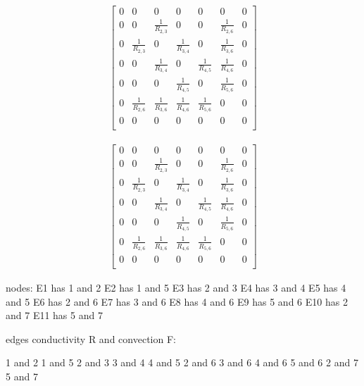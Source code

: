 \begin{equation}
	\begin{aligned}
		\begin{bmatrix}
			0 & 0 & 0 & 0 & 0 & 0 & 0\\
            0 & 0 & \frac{1}{R_{2,3}} & 0 & 0 & \frac{1}{R_{2,6}} & 0 \\
            0 & \frac{1}{R_{2,3}} & 0 & \frac{1}{R_{3,4}} & 0 & \frac{1}{R_{3,6}} & 0\\
            0 & 0 & \frac{1}{R_{3,4}} & 0 & \frac{1}{R_{4,5}} & \frac{1}{R_{4,6}} & 0\\
            0 & 0 & 0 & \frac{1}{R_{4,5}} & 0 & \frac{1}{R_{5,6}} & 0 \\
            0 & \frac{1}{R_{2,6}} & \frac{1}{R_{3,6}} & \frac{1}{R_{4,6}} & \frac{1}{R_{5,6}} & 0 & 0\\
            0 & 0 & 0 & 0 & 0 & 0 & 0\\
		\end{bmatrix}
	\end{aligned}
\end{equation}

\begin{equation}
	\begin{aligned}
		\begin{bmatrix}
			0 & 0 & 0 & 0 & 0 & 0 & 0\\
			0 & 0 & \frac{1}{R_{2,3}} & 0 & 0 & \frac{1}{R_{2,6}} & 0 \\
			0 & \frac{1}{R_{2,3}} & 0 & \frac{1}{R_{3,4}} & 0 & \frac{1}{R_{3,6}} & 0\\
			0 & 0 & \frac{1}{R_{3,4}} & 0 & \frac{1}{R_{4,5}} & \frac{1}{R_{4,6}} & 0\\
			0 & 0 & 0 & \frac{1}{R_{4,5}} & 0 & \frac{1}{R_{5,6}} & 0 \\
			0 & \frac{1}{R_{2,6}} & \frac{1}{R_{3,6}} & \frac{1}{R_{4,6}} & \frac{1}{R_{5,6}} & 0 & 0\\
			0 & 0 & 0 & 0 & 0 & 0 & 0\\
		\end{bmatrix}
	\end{aligned}
\end{equation}

nodes:
E1 has 1 and 2
E2 has 1 and 5
E3 has 2 and 3
E4 has 3 and 4
E5 has 4 and 5
E6 has 2 and 6
E7 has 3 and 6
E8 has 4 and 6
E9 has 5 and 6
E10 has 2 and 7
E11 has 5 and 7

edges conductivity R and convection F:

1 and 2
1 and 5
2 and 3
3 and 4
4 and 5
2 and 6
3 and 6
4 and 6
5 and 6
2 and 7
5 and 7

